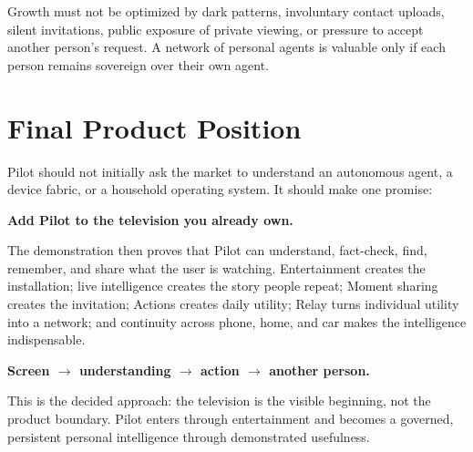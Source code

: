 \documentclass[11pt,a4paper]{article}
\begin{document}
Growth must not be optimized by dark patterns, involuntary contact uploads,
silent invitations, public exposure of private viewing, or pressure to accept
another person's request.  A network of personal agents is valuable only if
each person remains sovereign over their own agent.

\section{Final Product Position}

Pilot should not initially ask the market to understand an autonomous agent,
a device fabric, or a household operating system.  It should make one promise:

\begin{center}
\Large\textbf{Add Pilot to the television you already own.}
\end{center}

The demonstration then proves that Pilot can understand, fact-check, find,
remember, and share what the user is watching.  Entertainment creates the
installation; live intelligence creates the story people repeat; Moment
sharing creates the invitation; Actions creates daily utility; Relay turns
individual utility into a network; and continuity across phone, home, and car
makes the intelligence indispensable.

\begin{center}
\textbf{Screen $\rightarrow$ understanding $\rightarrow$ action
$\rightarrow$ another person.}
\end{center}

This is the decided approach: the television is the visible beginning, not the
product boundary.  Pilot enters through entertainment and becomes a governed,
persistent personal intelligence through demonstrated usefulness.
\end{document}
